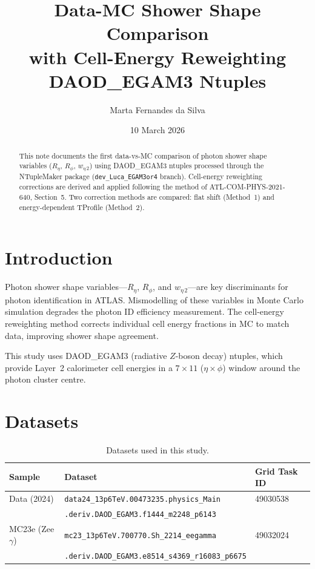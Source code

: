 \documentclass[a4paper,11pt]{article}
\title{Data-MC Shower Shape Comparison\\
       with Cell-Energy Reweighting\\[1em]
       \large DAOD\_EGAM3 Ntuples}
\author{Marta Fernandes da Silva}
\date{10 March 2026}
\begin{document}
\maketitle

\begin{abstract}
This note documents the first data-vs-MC comparison of photon shower shape
variables ($R_\eta$, $R_\phi$, $w_{\eta\,2}$) using DAOD\_EGAM3 ntuples
processed through the NTupleMaker package (\texttt{dev\_Luca\_EGAM3or4} branch).
Cell-energy reweighting corrections are derived and applied following the
method of ATL-COM-PHYS-2021-640, Section~5. Two correction methods are
compared: flat shift (Method~1) and energy-dependent TProfile (Method~2).
\end{abstract}

\tableofcontents
\newpage

\section{Introduction}

Photon shower shape variables---$R_\eta$, $R_\phi$, and $w_{\eta\,2}$---are
key discriminants for photon identification in ATLAS. Mismodelling of these
variables in Monte Carlo simulation degrades the photon ID efficiency
measurement. The cell-energy reweighting method corrects individual cell
energy fractions in MC to match data, improving shower shape agreement.

This study uses DAOD\_EGAM3 (radiative $Z$-boson decay) ntuples, which
provide Layer~2 calorimeter cell energies in a $7\times11$
($\eta\times\phi$) window around the photon cluster centre.

\section{Datasets}

\begin{table}[h]
\centering
\caption{Datasets used in this study.}
\label{tab:datasets}
\begin{tabular}{lll}
\toprule
\textbf{Sample} & \textbf{Dataset} & \textbf{Grid Task ID} \\
\midrule
Data (2024) & \texttt{data24\_13p6TeV.00473235.physics\_Main} & 49030538 \\
            & \texttt{.deriv.DAOD\_EGAM3.f1444\_m2248\_p6143} & \\
\midrule
MC23e (Zee$\gamma$) & \texttt{mc23\_13p6TeV.700770.Sh\_2214\_eegamma} & 49032024 \\
                     & \texttt{.deriv.DAOD\_EGAM3.e8514\_s4369\_r16083\_p6675} & \\
\bottomrule
\end{tabular}
\end{table}
\end{document}
